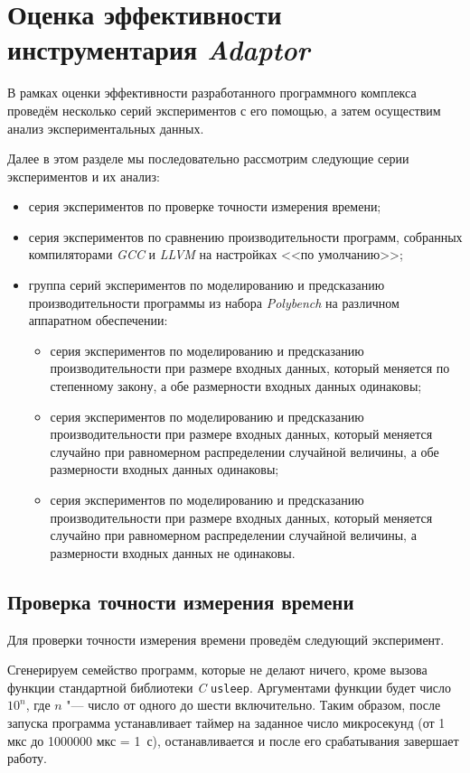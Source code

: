 \section{Оценка эффективности инструментария \textit{Adaptor}}
\label{sec:evaluation}

В рамках оценки эффективности разработанного программного комплекса проведём несколько серий экспериментов с его помощью, а затем осуществим анализ экспериментальных данных.

Далее в этом разделе мы последовательно рассмотрим следующие серии экспериментов и их анализ:
\begin{itemize}
    \item серия экспериментов по проверке точности измерения времени;
    \item серия экспериментов по сравнению производительности программ, собранных компиляторами \textit{GCC} и \textit{LLVM} на настройках <<по умолчанию>>;
    \item группа серий экспериментов по моделированию и предсказанию производительности программы из набора \textit{Polybench} на различном аппаратном обеспечении:
    \begin{itemize}
        \item серия экспериментов по моделированию и предсказанию производительности при размере входных данных, который меняется по степенному закону, а обе размерности входных данных одинаковы;
        \item серия экспериментов по моделированию и предсказанию производительности при размере входных данных, который меняется случайно при равномерном распределении случайной величины, а обе размерности входных данных одинаковы;
        \item серия экспериментов по моделированию и предсказанию производительности при размере входных данных, который меняется случайно при равномерном распределении случайной величины, а размерности входных данных не одинаковы.
    \end{itemize}
\end{itemize}

\subsection{Проверка точности измерения времени}
\label{ssec:series-accuracy}
Для проверки точности измерения времени проведём следующий эксперимент.

Сгенерируем семейство программ, которые не делают ничего, кроме вызова функции стандартной библиотеки \textit{C} \texttt{usleep}. Аргументами функции будет число $10^n$, где $n$ "--- число от одного до шести включительно. Таким образом, после запуска программа устанавливает таймер на заданное число микросекунд (от 1 мкс до 1000000 мкс = 1~с), останавливается и после его срабатывания завершает работу.

